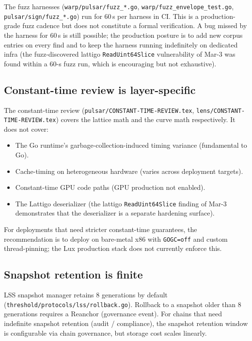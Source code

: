 \documentclass[11pt]{article}
\begin{document}
The fuzz harnesses (\verb|warp/pulsar/fuzz_*.go|,
\verb|warp/fuzz_envelope_test.go|, \verb|pulsar/sign/fuzz_*.go|) run for 60\,s
per harness in CI. This is a production-grade fuzz cadence but does not
constitute a formal verification. A bug missed by the harness for 60\,s is
still possible; the production posture is to add new corpus entries on every
find and to keep the harness running indefinitely on dedicated infra (the
fuzz-discovered lattigo \verb|ReadUint64Slice| vulnerability of Mar-3 was
found within a 60-s fuzz run, which is encouraging but not exhaustive).

\subsection{Constant-time review is layer-specific}

The constant-time review (\verb|pulsar/CONSTANT-TIME-REVIEW.tex|,
\verb|lens/CONSTANT-TIME-REVIEW.tex|) covers the lattice math and the curve
math respectively. It does not cover:

\begin{itemize}
\item The Go runtime's garbage-collection-induced timing variance
  (fundamental to Go).
\item Cache-timing on heterogeneous hardware (varies across deployment targets).
\item Constant-time GPU code paths (GPU production not enabled).
\item The Lattigo deserializer (the lattigo \verb|ReadUint64Slice| finding of
  Mar-3 demonstrates that the deserializer is a separate hardening surface).
\end{itemize}

For deployments that need stricter constant-time guarantees, the
recommendation is to deploy on bare-metal x86 with \verb|GOGC=off| and custom
thread-pinning; the Lux production stack does not currently enforce this.

\subsection{Snapshot retention is finite}

LSS snapshot manager retains 8 generations by default
(\verb|threshold/protocols/lss/rollback.go|). Rollback to a snapshot older
than 8 generations requires a Reanchor (governance event). For chains that
need indefinite snapshot retention (audit / compliance), the snapshot
retention window is configurable via chain governance, but storage cost
scales linearly.
\end{document}
